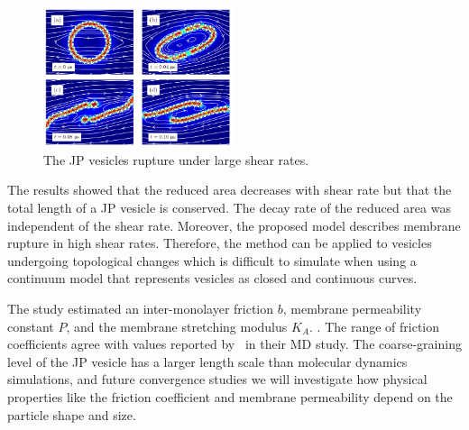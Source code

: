 \begin{figure}
\includegraphics[width=0.5\textwidth]{figures/PreliminaryWork/Rupture.pdf}
\caption{The JP vesicles rupture under large shear rates.}
\end{figure}
The results showed that the reduced area decreases with shear rate
but that the total length of a JP vesicle is conserved. The decay rate
of the reduced area was independent of the shear rate.
Moreover, the proposed model
describes membrane rupture in high shear rates. Therefore, the method
can be applied to vesicles undergoing topological changes which is
difficult to simulate when using a continuum model that represents
vesicles as closed and continuous curves.
%
%

%
%
The study estimated an inter-monolayer friction $b$, membrane permeability
constant $P$, and the membrane stretching modulus $K_A$.
\cite{chabanon2017, sch_vla_mik2010}.
The range of friction coefficients agree with values reported
by~\cite{denOtter2007} in their MD study. The coarse-graining level of
the JP vesicle has a larger length scale than molecular dynamics
simulations, and future convergence studies we will investigate
how physical properties like the friction coefficient and membrane
permeability depend on the particle shape and size.

